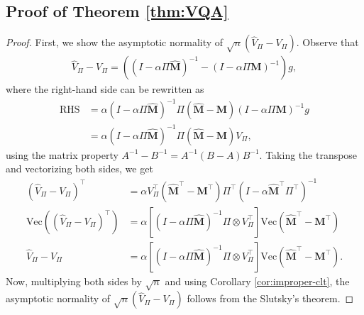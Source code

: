 \documentclass[twoside,11pt]{article}
\renewcommand{\Vec}[1]{\text{Vec}\lp #1\rp}
\numberwithin{equation}{section}
\newcommand{\lp}{\left(}
\newcommand{\rp}{\right)}
\begin{document}
\subsection{Proof of Theorem \ref{thm:VQA}}\label{prf:VQA}
\begin{proof}
First, we show the asymptotic normality of $\sqrt{n} \lp  \hat V_\Pi - V_\Pi \rp$.
    Observe that 
    \begin{align*}
        \hat V_\Pi - V_\Pi = \lp\lp I-\alpha\Pi \mathbf{\hat M}\rp^{-1} - \lp I-\alpha\Pi \mathbf{M}\rp^{-1}\rp g,
    \end{align*}
    where the right-hand side can be rewritten as
    \begin{align*}
         \text{RHS} &= \alpha \lp I-\alpha\Pi \mathbf{\hat M}\rp^{-1} \Pi \lp \mathbf{\hat M} - \mathbf{M} \rp \lp I-\alpha\Pi \mathbf{M}\rp^{-1} g \\
         & = \alpha \lp I-\alpha\Pi \hat{\mathbf{M}}\rp^{-1} \Pi \lp \hat{\mathbf{M}} - \mathbf{M} \rp V_\Pi,
    \end{align*}
    using the matrix property $A^{-1} - B^{-1} = A^{-1}(B-A)B^{-1}$.
    Taking the transpose and vectorizing both sides, we get
    \begin{align*}
        \lp  \hat V_\Pi - V_\Pi \rp^\top & = \alpha V_\Pi^\top (\mathbf{\hat M}^\top - \mathbf{M}^\top) \Pi^\top \lp I-\alpha\mathbf{\hat M}^\top \Pi^\top \rp^{-1} \\ 
        \Vec{\lp \hat V_\Pi - V_\Pi \rp^\top} & = \alpha \left[\lp I-\alpha \Pi \mathbf{\hat M} \rp^{-1} \Pi \otimes  V_\Pi^\top\right]\Vec{\mathbf{\hat M}^\top - \mathbf{M}^\top} \\
        \hat V_\Pi - V_\Pi & = \alpha \left[\lp I-\alpha \Pi \mathbf{\hat M} \rp^{-1} \Pi \otimes  V_\Pi^\top\right]\Vec{\mathbf{\hat M}^\top - \mathbf{M}^\top}.
    \end{align*}
    Now, multiplying both sides by $\sqrt{n}$ and using Corollary \ref{cor:improper-clt}, the asymptotic normality of $\sqrt{n} \lp  \hat V_\Pi - V_\Pi \rp$ follows from the Slutsky's theorem. 


\end{proof}
\end{document}
